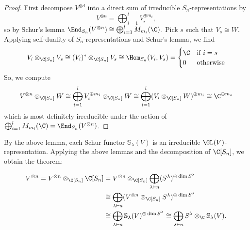 \documentclass[../main.tex]{subfiles}
\begin{document}
\begin{proof}
    First decompose $ V^{\otimes d} $ into a direct sum of irreducible $ S_{n} $-representations by
    \[
        V^{\otimes n} = \bigoplus_{i=1}^{l} V_{i}^{\oplus m_{i}},
    \]
    so by Schur's lemma $ \End_{S_{n}}(V^{\otimes n})\cong \bigoplus_{i=1}^{l} M_{m_{i}}(\C) $.
    Pick $ s $ such that $ V_{s}\cong W $. Applying self-duality of $ S_{n} $-representations and Schur's lemma, we find
    \begin{align*}
        V_{i} \otimes_{\C[S_{n}]} V_{s} \cong (V_{i})^{*} \otimes_{\C[S_{n}]} V_{s} \cong \Hom_{S_{n}}(V_{i},V_{s}) = \begin{cases}
            \C & \text{if }i=s\\
            0 & \text{otherwise}
        \end{cases}
    \end{align*}
    So, we compute
    \[
        V^{\otimes n} \otimes_{\C[S_{n}]} W\cong \bigoplus_{i=1}^{l} V_{i}^{\oplus m_{i}}\otimes_{\C[S_{n}]} W \cong \bigoplus_{i=1}^{l} (V_{i}\otimes_{\C[S_{n}]} W)^{\oplus m_{i}} \cong\C^{\oplus m_{s}}
    \]
    which is most definitely irreducible under the action of $ \bigoplus_{i=1}^{l}M_{m_{i}}(\C) = \End_{S_{n}}(V^{\otimes n}) $.
\end{proof}
By the above lemma, each Schur functor $ \mathbb{S}_{\lambda}(V) $ is an irreducible $ \GL(V) $-representation. Applying the above lemmas and the decomposition of $ \C[S_{n}] $, we obtain the theorem:

\begin{align*}
    V^{\otimes n} = V^{\otimes n}\otimes_{\C[S_{n}]}\C[S_{n}] &= V^{\otimes n}\otimes_{\C[S_{n}]}\bigoplus_{\lambda\vdash n} (S^{\lambda})^{\oplus \dim{S^{\lambda}}}\\
    &\cong\bigoplus_{\lambda\vdash n} (V^{\otimes n}\otimes_{\C[S_{n}]}S^{\lambda})^{\oplus \dim{S^{\lambda}}}\\
    &\cong\bigoplus_{\lambda\vdash n} \mathbb{S}_{\lambda}(V)^{\oplus \dim{S^{\lambda}}} \cong \bigoplus_{\lambda\vdash n} S^{\lambda}\otimes_{\C}\mathbb{S}_{\lambda}(V).
\end{align*}
\end{document}
